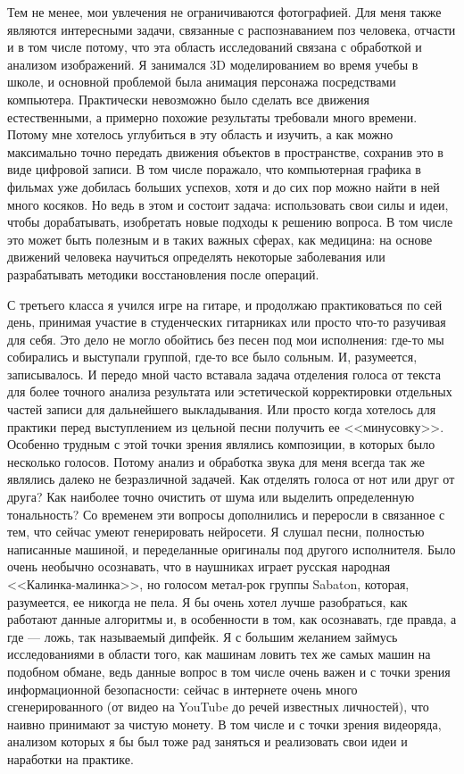 \quad Тем не менее, мои увлечения не ограничиваются фотографией. Для меня также являются интересными задачи, связанные с распознаванием поз
человека, отчасти и в том числе потому, что эта область исследований связана с обработкой и анализом изображений. Я занимался 3D
моделированием во время учебы в школе, и основной проблемой была анимация персонажа посредствами компьютера. Практически невозможно было
сделать все движения естественными, а примерно похожие результаты требовали много времени. Потому мне хотелось углубиться в эту область и
изучить, а как можно максимально точно передать движения объектов в пространстве, сохранив это в виде цифровой записи. В том числе поражало,
что компьютерная графика в фильмах уже добилась больших успехов, хотя и до сих пор можно найти в ней много косяков. Но ведь в этом и состоит
задача: использовать свои силы и идеи, чтобы дорабатывать, изобретать новые подходы к решению вопроса. В том числе это может быть полезным и
в таких важных сферах, как медицина: на основе движений человека научиться определять некоторые заболевания или разрабатывать методики
восстановления после операций.

\quad С третьего класса я учился игре на гитаре, и продолжаю практиковаться по сей день, принимая участие в студенческих гитарниках или просто
что-то разучивая для себя. Это дело не могло обойтись без песен под мои исполнения: где-то мы собирались и выступали группой, где-то все было
сольным. И, разумеется, записывалось. И передо мной часто вставала задача отделения голоса от текста для более точного анализа результата или
эстетической корректировки отдельных частей записи для дальнейшего выкладывания. Или просто когда хотелось для практики перед выступлением из
цельной песни получить ее <<минусовку>>. Особенно трудным с этой точки зрения являлись композиции, в которых было несколько голосов. Потому
анализ и обработка звука для меня всегда так же являлись далеко не безразличной задачей. Как отделять голоса от нот или друг от друга? Как
наиболее точно очистить от шума или выделить определенную тональность? Со временем эти вопросы дополнились и переросли в связанное с тем, что
сейчас умеют генерировать нейросети. Я слушал песни, полностью написанные машиной, и переделанные оригиналы под другого исполнителя. Было очень
необычно осознавать, что в наушниках играет русская народная <<Калинка-малинка>>, но голосом метал-рок группы Sabaton, которая, разумеется, ее
никогда не пела. Я бы очень хотел лучше разобраться, как работают данные алгоритмы и, в особенности в том, как осознавать, где правда, а
где --- ложь, так называемый дипфейк. Я с большим желанием займусь исследованиями в области того, как машинам ловить тех же самых машин на
подобном обмане, ведь данные вопрос в том числе очень важен и с точки зрения информационной безопасности: сейчас в интернете очень много
сгенерированного (от видео на YouTube до речей известных личностей), что наивно принимают за чистую монету. В том числе и с точки зрения
видеоряда, анализом которых я бы был тоже рад заняться и реализовать свои идеи и наработки на практике.

